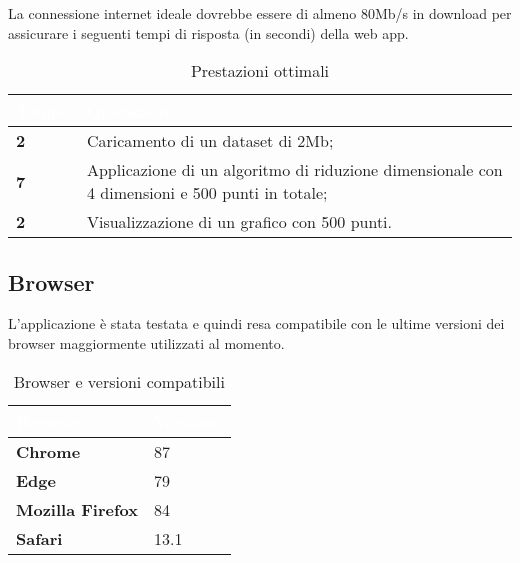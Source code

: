 La connessione internet ideale dovrebbe essere di almeno 80Mb/s in download per assicurare i seguenti tempi di risposta (in secondi) della web app. 
{
\setlength\arrayrulewidth{0.95pt}
\renewcommand{\arraystretch}{1.5}
\begin{longtable}{C{2cm} C{10cm}}

\textcolor{white}{\textbf{Tempo}}&
\textcolor{white}{\textbf{Operazione}} \\
\endfirsthead
\endfoot
{}\caption{Prestazioni ottimali}
\endlastfoot
	
	\textbf{2} &
	Caricamento di un dataset di 2Mb;  \\
 
	\textbf{7} & 
	Applicazione di un algoritmo  di riduzione dimensionale con 4 dimensioni e 500 punti in totale; \\
	
	\textbf{2} &
	Visualizzazione di un grafico con 500 punti.  \\	
	
\end{longtable}	
}

\subsection{Browser}
L'applicazione è stata testata e quindi resa compatibile con le ultime versioni dei browser maggiormente utilizzati al momento.
{
\setlength\arrayrulewidth{0.95pt}
\renewcommand{\arraystretch}{1.5}
\begin{longtable}{C{4cm} C{4cm}}

\textcolor{white}{\textbf{Browser}}&
\textcolor{white}{\textbf{Versione}} \\
\endfirsthead
\endfoot
{}\caption{Browser e versioni compatibili}
\endlastfoot
	
	\textbf{Chrome} &
	 87 \\
 
	\textbf{Edge} & 
	79\\
	
	\textbf{Mozilla Firefox} &
	 84 \\
 
	\textbf{Safari} & 
	13.1 \\
	
\end{longtable}	
}

